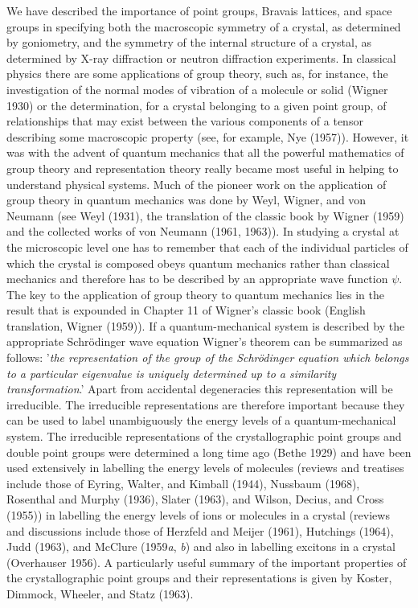 \documentclass[11pt,a4paper,twoside,openright]{book}
\begin{document}
We have described the importance of point groups, Bravais lattices, and space groups in specifying both the macroscopic symmetry of a crystal, as determined by goniometry, and the symmetry of the internal structure of a crystal, as determined by X-ray diffraction or neutron diffraction experiments. In classical physics there are some applications of group theory, such as, for instance, the investigation of the normal modes of vibration of a molecule or solid (Wigner 1930) or the determination, for a crystal belonging to a given point group, of relationships that may exist between the various components of a tensor describing some macroscopic property (see, for example, Nye (1957)). However, it was with the advent of quantum mechanics that all the powerful mathematics of group theory and representation theory really became most useful in helping to understand physical systems. Much of the pioneer work on the application of group theory in quantum mechanics was done by Weyl, Wigner, and von Neumann (see Weyl (1931), the translation of the classic book by Wigner (1959) and the collected works of von Neumann (1961, 1963)). In studying a crystal at the microscopic level one has to remember that each of the individual particles of which the crystal is composed obeys quantum mechanics rather than classical mechanics and therefore has to be described by an appropriate wave function $\psi$. The key to the application of group theory to quantum mechanics lies in the result that is expounded in Chapter 11 of Wigner's classic book (English translation, Wigner (1959)). If a quantum-mechanical system is described by the appropriate Schrödinger wave equation Wigner's theorem can be summarized as follows: '\textit{the representation of the group of the Schrödinger equation which belongs to a particular eigenvalue is uniquely determined up to a similarity transformation}.' Apart from accidental degeneracies this representation will be irreducible. The irreducible representations are therefore important because they can be used to label unambiguously the energy levels of a quantum-mechanical system. The irreducible representations of the crystallographic point groups and double point groups were determined a long time ago (Bethe 1929) and have been used extensively in labelling the energy levels of molecules (reviews and treatises include those of Eyring, Walter, and Kimball (1944), Nussbaum (1968), Rosenthal and Murphy (1936), Slater (1963), and Wilson, Decius, and Cross (1955)) in labelling the energy levels of ions or molecules in a crystal (reviews and discussions include those of Herzfeld and Meijer (1961), Hutchings (1964), Judd (1963), and McClure (1959\textit{a}, \textit{b}) and also in labelling excitons in a crystal (Overhauser 1956). A particularly useful summary of the important properties of the crystallographic point groups and their representations is given by Koster, Dimmock, Wheeler, and Statz (1963).
\end{document}
